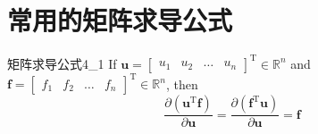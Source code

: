 \documentclass[withoutpreface,bwprint]{NoteBook}
\begin{document}
\section{常用的矩阵求导公式}
\begin{matrixDerivativeEquation}
    {} %
    {矩阵求导公式4_1} %
    If 
    $\mathbf{u}=
    \begin{bmatrix}
        u_1 & u_2 & \dots & u_n     
    \end{bmatrix}^\mathrm{T} \in \mathbb{R}^n$ and
    $\mathbf{f}=
    \begin{bmatrix}
        f_1 & f_2 & \dots & f_n     
    \end{bmatrix}^\mathrm{T} \in \mathbb{R}^n
    $, then
    $$
    \frac{\partial (\mathbf{u}^\mathrm{T}\mathbf{f})}{\partial \mathbf{u}} 
    =
    \frac{\partial (\mathbf{f}^\mathrm{T}\mathbf{u})}{\partial \mathbf{u}} 
    =
    \mathbf{f}
    $$
\end{matrixDerivativeEquation}
\end{document}
